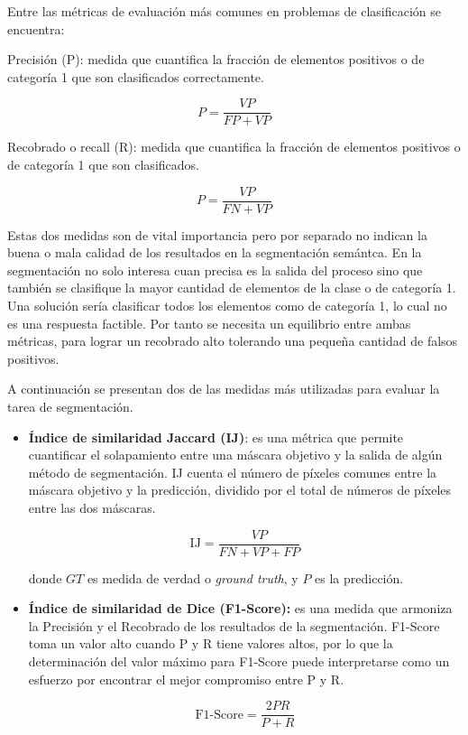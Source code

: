 Entre las métricas de evaluación más comunes en problemas de clasificación se encuentra:

\begin{definition}
	Precisión (P): medida que cuantifica la fracción de elementos positivos o de categoría 1 que son clasificados correctamente. 
	
	$$ P = \frac{VP}{FP + VP}$$	
\end{definition}

\begin{definition}
	Recobrado o recall (R): medida que cuantifica la fracción de elementos positivos o de categoría 1 que son clasificados.
	
	$$ P = \frac{VP}{FN + VP}$$	
\end{definition}

Estas dos medidas son de vital importancia pero por separado no indican la buena o mala calidad de los resultados en la segmentación semántca. En la segmentación no solo interesa cuan precisa es la salida del proceso sino que también se clasifique la mayor cantidad de elementos de la clase o de categoría 1. Una solución sería clasificar todos los elementos como de categoría 1, lo cual no es una respuesta factible. Por tanto se necesita un equilibrio entre ambas métricas, para lograr un recobrado alto tolerando una pequeña cantidad de falsos positivos.

A continuación se presentan dos de las medidas más utilizadas para evaluar la tarea de segmentación.

\begin{itemize}
	\item \textbf{Índice de similaridad Jaccard (IJ)}: es una métrica que permite cuantificar el solapamiento entre una máscara objetivo y la salida de algún método de segmentación. IJ cuenta el número de píxeles comunes entre la máscara objetivo y la predicción, dividido por el total de números de píxeles entre las dos máscaras.
	
	\begin{equation}
		\text{IJ} = \frac{VP}{FN + VP + FP}
	\end{equation}

	donde $GT$ es medida de verdad o \textit{ground truth}, y $P$ es la predicción.
	
	\item \textbf{Índice de similaridad de Dice (F1-Score):} es una medida que armoniza la Precisión y el Recobrado de los resultados de la segmentación. F1-Score toma un valor alto cuando P y R tiene valores altos, por lo que la determinación del valor máximo para F1-Score puede interpretarse como un esfuerzo por encontrar el mejor compromiso entre P y R.
	
		
	\begin{equation}
		\text{F1-Score} = \frac{2PR}{P + R}
	\end{equation}
\end{itemize}


